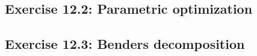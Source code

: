 %

\subsection*{Exercise 12.2: Parametric optimization}


\subsection*{Exercise 12.3: Benders decomposition}


